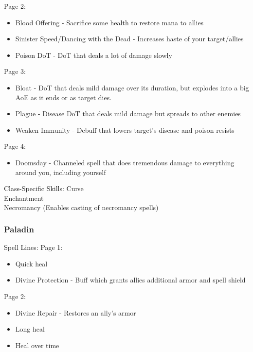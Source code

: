 \documentclass{article}
\begin{document}
Page 2:
\begin{itemize}
    \item Blood Offering - Sacrifice some health to restore mana to allies
    \item Sinister Speed/Dancing with the Dead - Increases haste of your target/allies
    \item Poison DoT - DoT that deals a lot of damage slowly
    
\end{itemize}

Page 3:
\begin{itemize}
    \item Bloat - DoT that deals mild damage over its duration, but explodes into a big AoE as it ends or as
        target dies.
    \item Plague - Disease DoT that deals mild damage but spreads to other enemies
    \item Weaken Immunity - Debuff that lowers target's disease and poison resists
    
\end{itemize}

Page 4:
\begin{itemize}
    \item Doomsday - Channeled spell that does tremendous damage to everything around you, including yourself
\end{itemize}

Class-Specific Skills:
Curse\\
Enchantment\\
Necromancy (Enables casting of necromancy spells)\\


\subsubsection{Paladin}
Spell Lines:
Page 1:
\begin{itemize}
    \item Quick heal
    \item Divine Protection - Buff which grants allies additional armor and spell shield
    
\end{itemize}

Page 2:
\begin{itemize}
    \item Divine Repair - Restores an ally's armor
    \item Long heal
    \item Heal over time
    
\end{itemize}
\end{document}
